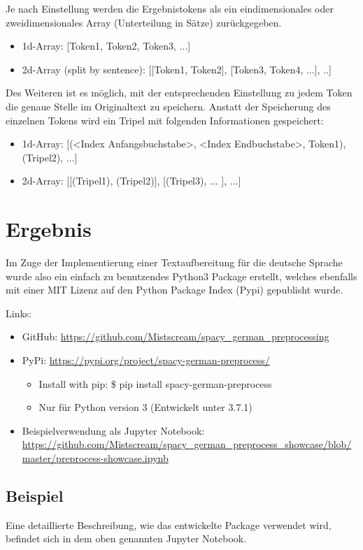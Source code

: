 Je nach Einstellung werden die Ergebnistokens als ein eindimensionales oder zweidimensionales Array (Unterteilung in Sätze) zurückgegeben.
\begin{itemize}
\item 1d-Array: [Token1, Token2, Token3, ...]
\item 2d-Array (split by sentence): [[Token1, Token2], [Token3, Token4, ...], ..]
\end{itemize}
Des Weiteren ist es möglich, mit der entsprechenden Einstellung zu jedem Token die genaue Stelle im Originaltext zu speichern. Anstatt der Speicherung des einzelnen Tokens wird ein Tripel mit folgenden Informationen gespeichert: 
\begin{itemize}
\item 1d-Array: [(<Index Anfangsbuchstabe>, <Index Endbuchstabe>, Token1), (Tripel2), ...]
\item 2d-Array: [[(Tripel1), (Tripel2)], [(Tripel3), ... ], ...]
\end{itemize}

\section{Ergebnis}
Im Zuge der Implementierung einer Textaufbereitung für die deutsche Sprache wurde also ein einfach zu benutzendes Python3 Package erstellt, welches ebenfalls mit einer MIT Lizenz auf den Python Package Index (Pypi) gepublisht wurde. 

Links:
\begin{itemize}
\item GitHub: \url{https://github.com/Mistscream/spacy_german_preprocessing}
\item PyPi: \url{https://pypi.org/project/spacy-german-preprocess/}
\begin{itemize}
\item Install with pip: \$ pip install spacy-german-preprocess
\item Nur für Python version 3 (Entwickelt unter 3.7.1)
\end{itemize}
\item Beispielverwendung als Jupyter Notebook: \url{https://github.com/Mistscream/spacy_german_preprocess_showcase/blob/master/preprocess-showcase.ipynb}
\end{itemize}

\subsection{Beispiel}
Eine detaillierte Beschreibung, wie das entwickelte Package verwendet wird, befindet sich in dem oben genannten Jupyter Notebook.

